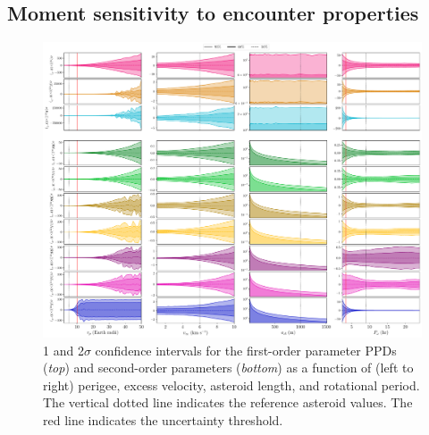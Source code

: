 \documentclass[fleqn,usenatbib]{mnras}
\begin{document}
\subsection{Moment sensitivity to encounter properties}
\label{sec:moment-uncertainty}

\begin{figure}
  \centering
  \includegraphics[angle=90, origin=c, width=0.98\linewidth]{figs/scan-all1.pdf}
  \caption{1 and 2$\sigma$ confidence intervals for the first-order parameter PPDs (\textit{top}) and second-order parameters (\textit{bottom}) as a function of (left to right) perigee, excess velocity, asteroid length, and rotational period. The vertical dotted line indicates the reference asteroid values. The red line indicates the uncertainty threshold.}
  \label{fig:scan-perigee}
  \label{fig:scan-vex}
  \label{fig:scan-am}
  \label{fig:scan-period}
  \label{fig:scan-physical}
\end{figure}
\end{document}
